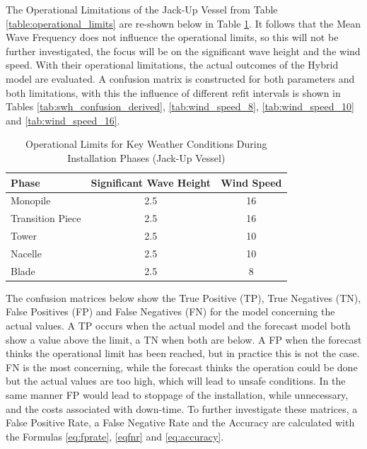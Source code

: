 \noindent The Operational Limitations of the Jack-Up Vessel from Table \ref{table:operational_limits} are re-shown below in Table \ref{table:operational_limits_jackup}. It follows that the Mean Wave Frequency does not influence the operational limits, so this will not be further investigated, the focus will be on the significant wave height and the wind speed. With their operational limitations, the actual outcomes of the Hybrid model are evaluated. A confusion matrix is constructed for both parameters and both limitations, with this the influence of different refit intervals is shown in Tables \ref{tab:swh_confusion_derived}, \ref{tab:wind_speed_8}, \ref{tab:wind_speed_10} and \ref{tab:wind_speed_16}.\\


\begin{table}[ht!]
    \centering
    \caption{Operational Limits for Key Weather Conditions During Installation Phases (Jack-Up Vessel)}
    \label{table:operational_limits_jackup}
    \begin{tabular}{|l|c|c|}
        \hline
        \textbf{Phase} & \textbf{Significant Wave Height} & \textbf{Wind Speed} \\
        \hline
        Monopile         & 2.5 & 16 \\
        \hline
        Transition Piece & 2.5 & 16 \\
        \hline
        Tower            & 2.5 & 10 \\
        \hline
        Nacelle          & 2.5 & 10 \\
        \hline
        Blade            & 2.5 & 8 \\
        \hline
    \end{tabular}
\end{table}

\noindent The confusion matrices below show the True Positive (TP), True Negatives (TN), False Positives (FP) and False Negatives (FN) for the model concerning the actual values. A TP occurs when the actual model and the forecast model both show a value above the limit, a TN when both are below. A FP when the forecast thinks the operational limit has been reached, but in practice this is not the case. FN is the most concerning, while the forecast thinks the operation could be done but the actual values are too high, which will lead to unsafe conditions. In the same manner FP would lead to stoppage of the installation, while unnecessary, and the costs associated with down-time. To further investigate these matrices, a False Positive Rate, a False Negative Rate and the Accuracy are calculated with the Formulas \ref{eq:fprate}, \ref{eqfnr} and \ref{eq:accuracy}.\\

